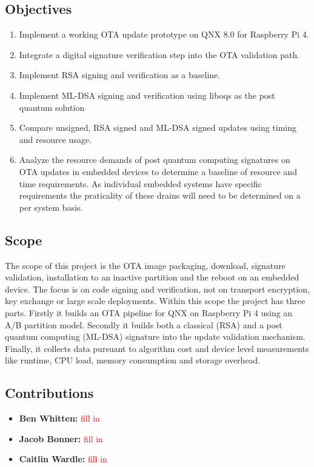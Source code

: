 \documentclass[12pt]{article}
\begin{document}
\subsection{Objectives}
\begin{enumerate}[leftmargin=2em]
    \item Implement a working OTA update prototype on QNX 8.0 for Raspberry Pi 4.
    \item Integrate a digital signature verification step into the OTA validation path.
    \item Implement RSA signing and verification as a baseline.
    \item Implement ML-DSA signing and verification using liboqs as the post quantum solution
    \item Compare unsigned, RSA signed and ML-DSA signed updates using timing and resource usage.
    \item Analyze the resource demands of post quantum computing signatures on OTA updates in embedded devices to determine a baseline of resource and time requirements. As individual embedded systems have specific requirements the praticality of these drains will need to be determined on a per system basis.  
\end{enumerate}
\subsection{Scope}
The scope of this project is the OTA image packaging, download, signature validation, installation to an inactive partition and the reboot on an embedded device. The focus is on code signing and verification, not on transport encryption, key exchange or large scale deployments. Within this scope the project has three parts. Firstly it builds an OTA pipeline for QNX on Raspberry Pi 4 using an A/B partition model. Secondly it builds both a classical (RSA) and a post quantum computing (ML-DSA) signature into the update validation mechanism. Finally, it collects data pursuant to algorithm cost and device level measurements like runtime, CPU load, memory consumption and storage overhead.  
\subsection{Contributions}
\begin{itemize}[leftmargin=2em]
    \item \textbf{Ben Whitten:} \textcolor{red}{fill in}
    \item \textbf{Jacob Bonner:} \textcolor{red}{fill in}
    \item \textbf{Caitlin Wardle:} \textcolor{red}{fill in}
\end{itemize}
\end{document}
